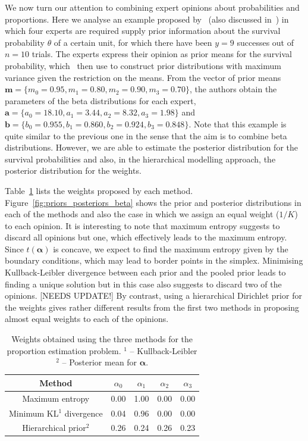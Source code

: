 \documentclass[a4paper, notitlepage, 10pt]{article}
\begin{document}
We now turn our attention to combining expert opinions about probabilities and proportions.
Here we analyse an example proposed by~\cite{savchuk1994} (also discussed in~\cite{rufo2012B}) in which four experts are required supply prior information about the survival probability $\theta$ of a certain unit, for which there have been $y = 9$ successes out of $n = 10$ trials.
The experts express their opinion as prior means for the survival probability, which~\cite{savchuk1994} then use to construct prior distributions with maximum variance given the restriction on the means.
From the vector of prior means $\mathbf{m} = \{ m_0 = 0.95, m_1 = 0.80, m_2 = 0.90, m_3 = 0.70 \}$, the authors obtain the parameters of the beta distributions for each expert,  $\mathbf{a} = \{ a_0 = 18.10, a_1 = 3.44 , a_2 = 8.32, a_3 = 1.98 \}$ and  $\mathbf{b} = \{ b_0 = 0.955 , b_1 = 0.860, b_2 = 0.924, b_3 = 0.848\}$.
Note that this example is quite similar to the previous one in the sense that the aim is to combine beta distributions. 
However, we are able to estimate the posterior distribution for the survival probabilities and also, in the hierarchical modelling approach, the posterior distribution for the weights.

Table~\ref{tab:alphasBeta} lists the weights proposed by each method.
Figure~\ref{fig:priors_posteriors_beta} shows the prior and posterior distributions in each of the methods and also the case in which we assign an equal weight ($1/K$) to each opinion.
It is interesting to note that maximum entropy suggests to discard all opinions but one, which effectively leads to the maximum entropy.
Since $t(\boldsymbol\alpha)$ is concave, we expect to find the maximum entropy given by the boundary conditions, which may lead to border points in the simplex.
Minimising Kullback-Leibler divergence between each prior and the pooled prior leads to finding a unique solution but in this case also suggests to discard two of the opinions. [NEEDS UPDATE!]
By contrast, using a hierarchical Dirichlet prior for the weights gives rather different results from the first two methods in proposing almost equal weights to each of the opinions.

\begin{table}[ht]
\caption{Weights obtained using the three methods for the proportion estimation problem. $^1$ -- Kullback-Leibler $^2$ -- Posterior mean for $\boldsymbol\alpha$.}
\centering
\begin{tabular}{ccccc}
  \hline
Method  & $\alpha_0$ & $\alpha_1$ & $\alpha_2$ & $\alpha_3$ \\ 
  \hline
Maximum entropy & 0.00 & 1.00 & 0.00 & 0.00 \\ 
Minimum KL$^1$ divergence& 0.04 & 0.96 & 0.00 & 0.00 \\ 
Hierarchical prior$^2$ & 0.26 & 0.24 & 0.26 & 0.23 \\ 
   \hline
\end{tabular}
\label{tab:alphasBeta}
\end{table}
\end{document}
